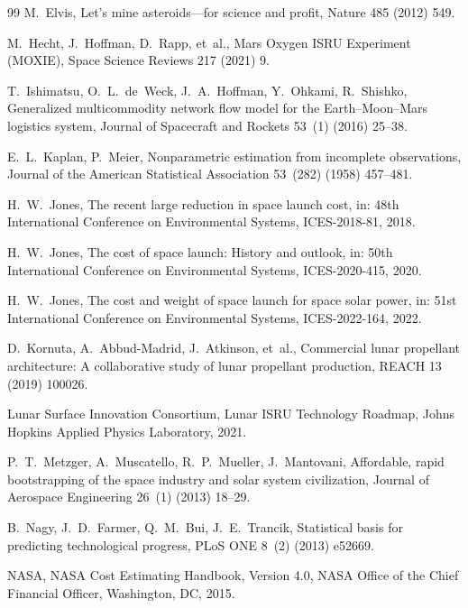 \documentclass[preprint,12pt]{elsarticle}
\begin{document}
\begin{thebibliography}{99}
M.~Elvis,
\newblock Let's mine asteroids---for science and profit,
\newblock Nature 485 (2012) 549.

M.~Hecht, J.~Hoffman, D.~Rapp, et~al.,
\newblock Mars Oxygen ISRU Experiment (MOXIE),
\newblock Space Science Reviews 217 (2021) 9.

T.~Ishimatsu, O.~L.~de~Weck, J.~A.~Hoffman, Y.~Ohkami, R.~Shishko,
\newblock Generalized multicommodity network flow model for the Earth--Moon--Mars logistics system,
\newblock Journal of Spacecraft and Rockets 53~(1) (2016) 25--38.

E.~L.~Kaplan, P.~Meier,
\newblock Nonparametric estimation from incomplete observations,
\newblock Journal of the American Statistical Association 53~(282) (1958) 457--481.

H.~W.~Jones,
\newblock The recent large reduction in space launch cost,
\newblock in: 48th International Conference on Environmental Systems, ICES-2018-81, 2018.

H.~W.~Jones,
\newblock The cost of space launch: History and outlook,
\newblock in: 50th International Conference on Environmental Systems, ICES-2020-415, 2020.

H.~W.~Jones,
\newblock The cost and weight of space launch for space solar power,
\newblock in: 51st International Conference on Environmental Systems, ICES-2022-164, 2022.

D.~Kornuta, A.~Abbud-Madrid, J.~Atkinson, et~al.,
\newblock Commercial lunar propellant architecture: A collaborative study of lunar propellant production,
\newblock REACH 13 (2019) 100026.

Lunar Surface Innovation Consortium,
\newblock Lunar ISRU Technology Roadmap,
\newblock Johns Hopkins Applied Physics Laboratory, 2021.

P.~T.~Metzger, A.~Muscatello, R.~P.~Mueller, J.~Mantovani,
\newblock Affordable, rapid bootstrapping of the space industry and solar system civilization,
\newblock Journal of Aerospace Engineering 26~(1) (2013) 18--29.

B.~Nagy, J.~D.~Farmer, Q.~M.~Bui, J.~E.~Trancik,
\newblock Statistical basis for predicting technological progress,
\newblock PLoS ONE 8~(2) (2013) e52669.

NASA,
\newblock NASA Cost Estimating Handbook, Version 4.0,
\newblock NASA Office of the Chief Financial Officer, Washington, DC, 2015.


\end{thebibliography}
\end{document}
